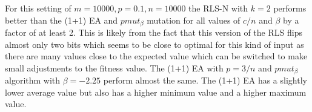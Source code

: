 For this setting of $m=10000, p=0.1, n=10000$ the RLS-N with $k=2$ performs better than the  (1+1) EA and $pmut_\beta$ mutation for all values of $c/n$ and $\beta$ by a factor of at least 2. This is likely from the fact that this version of the RLS flips almost only two bits which seems to be close to optimal for this kind of input as there are many values close to the expected value which can be switched to make small adjustments to the fitness value. The (1+1) EA with $p=3/n$ and $pmut_\beta$ algorithm with $\beta=-2.25$ perform almost the same. The (1+1) EA has a slightly lower average value but also has a higher minimum value and a higher maximum value.